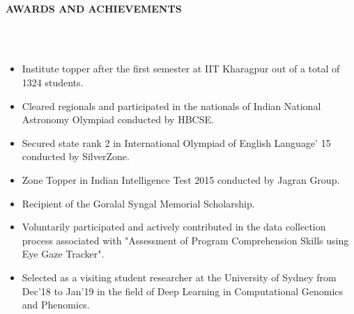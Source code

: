 \documentclass[letter,10pt]{book}
\newcommand{\lsep}{-0.5cm}
\newcommand{\resheading}[1]{{\small \colorbox{mygrey}{\begin{minipage}{0.975\textwidth}{\textbf{#1 \vphantom{p\^{E}}}}\end{minipage}}}}
\begin{document}
\hspace{0.5cm}\\[-0.2cm]
\resheading{\textbf{AWARDS AND ACHIEVEMENTS} }\\[\lsep]
\\[-1em]
\begin{itemize}
\item Institute topper after the first semester at IIT Kharagpur out of a total of 1324 students. 
\\[-2em]
\item Cleared regionals and participated in the nationals of Indian National Astronomy Olympiad conducted by HBCSE.
\\[-2em]
\item Secured state rank 2 in International Olympiad of English Language’ 15
conducted by SilverZone.
\\[-2em]
\item Zone Topper in Indian Intelligence Test 2015 conducted by Jagran Group.
\\[-2em]
\item Recipient of the Goralal Syngal Memorial Scholarship.
\\[-2em]
\item Voluntarily participated and actively contributed in the data collection process associated with "Assessment of Program Comprehension Skills using Eye Gaze Tracker".
\\[-2em]
\item Selected as a visiting student researcher at the University of Sydney from Dec'18 to Jan'19 in the field of Deep Learning in Computational Genomics and Phenomics. 
\\[-2em]
\end{itemize}
\end{document}
